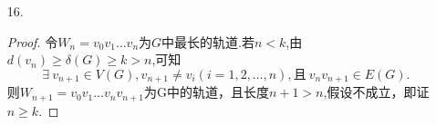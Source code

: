 \documentclass{article}
\begin{document}
\begin{enumerate}
\begin{proof}
\begin{enumerate}
            假设\[\exists\ x_0\in X,d_{H}(x_0)< d_{G[X]} (x_0).\]
            则删去$H$中与$x_0$关联的边,共$d_{H}(x_0)$条,增添边$vx_0\left(vx_0\in E(G),v\in X\right)$,共$d_{G[X]}(x_0)$条.

            记此时的图为$H',X'=X-x_0,Y'=Y+x_0$,则$X'\cup Y'$为$H'$的一个二分划分,且
            \[\varepsilon\left(H'\right)=\varepsilon\left(H\right)-d_{H}(x_0)+d_{G[X]}(x_0)>\varepsilon\left(H\right)\]
            与$H$是$G$的生成子图中边最多的二分图矛盾.即证
            \[\forall\ x\in X,d_{H}(x)\geqslant d_{G[X]} (x),\ \mbox{同理,可证}\ \forall\ y\in X,d_{H}(y)\geqslant d_{G[Y]} (y).\]
            
            \item [(2)]$\forall\ x\in X,y\in Y$,
            \[
                \begin{cases}
                    &d_{G}(x) =d_{H}(x)+d_{G[X]}(x)\\
                    &d_{G}(y) =d_{H}(y)+d_{G[Y]}(y)
                \end{cases}
                \xrightarrow[d_{H}(y)\geqslant d_{G[Y]} (y)]{d_{H}(x)\geqslant d_{G[X]} (x)}
                \begin{cases}
                    &d_{H}(x)\geqslant d_{G}(x)/2\\
                    &d_{H}(y)\geqslant d_{G}(y)/2
                \end{cases}
            \]
            即证\[\forall\ u\in V(H)=V(G),d_{H}(u)\geqslant d_{G}(u)/2.\]
        \end{enumerate}
    \end{proof}
    \item [16.]\begin{proof}
        令$W_n=v_0 v_1\dots v_n$为$G$中最长的轨道.若$n<k$,由$d(v_n)\geqslant \delta (G)\geqslant k>n$,可知
        \[
            \exists\ v_{n+1}\in V(G),v_{n+1}\neq v_i(i=1,2,\dots,n),\mbox{且}\ v_n v_{n+1}\in E(G).
        \]
        则$W_{n+1}=v_0 v_1 \dots v_n v_{n+1}$为G中的轨道，且长度$n+1>n$,假设不成立，即证$n\geqslant k$.
    \end{proof}
\end{enumerate}
\end{document}
